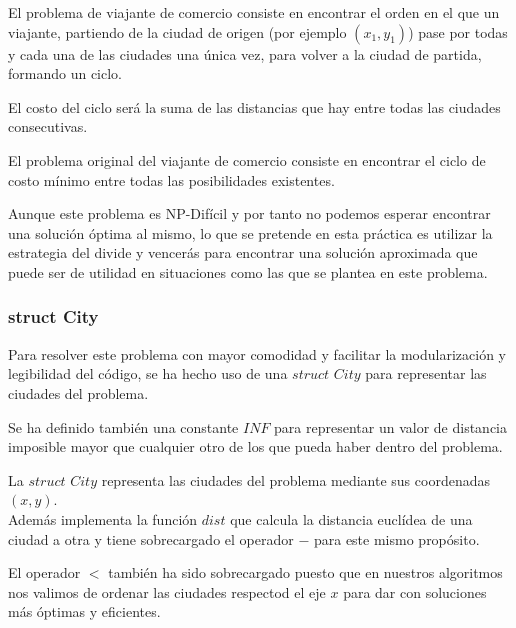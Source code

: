 \documentclass{article}
\begin{document}
El problema de viajante de comercio consiste en encontrar el
orden en el que un viajante, partiendo de la ciudad de origen
(por ejemplo $(x_1, y_1)$) pase por todas y cada una de las ciudades
una única vez, para volver a la ciudad de partida, formando un ciclo.

El costo del ciclo será la suma de las distancias que hay entre todas las ciudades consecutivas.

El problema original del viajante de comercio consiste en encontrar el ciclo de costo mínimo entre todas las posibilidades existentes.

Aunque este problema es NP-Difícil y por tanto no podemos esperar
encontrar una solución óptima al mismo, lo que se pretende en esta
práctica es utilizar la estrategia del divide y vencerás
para encontrar una solución aproximada que puede ser de utilidad en
situaciones como las que se plantea en este problema.

\subsubsection{struct City}

Para resolver este problema con mayor comodidad y facilitar la modularización y legibilidad del código, se ha hecho uso de una  $struct$ $City$ para representar las ciudades del problema.

Se ha definido también una constante $INF$ para representar un valor de distancia imposible mayor que cualquier otro de los que pueda haber dentro del problema.

%

La $struct$ $City$ representa las ciudades del problema mediante sus coordenadas $(x,y)$.\\

Además implementa la función $dist$ que calcula la distancia euclídea de una ciudad a otra y tiene sobrecargado el operador $-$ para este mismo propósito.


El operador $<$ también ha sido sobrecargado puesto que en nuestros algoritmos nos valimos de ordenar las ciudades respectod el eje $x$ para dar con soluciones más óptimas y eficientes.


\end{document}
